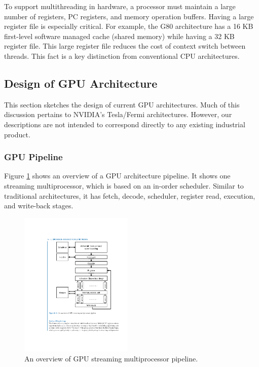 \documentclass[twocolumn]{article}
\begin{document}
To support multithreading in hardware, a processor must maintain a large number of registers, PC registers, and memory operation buffers. Having a large register file is especially critical. For example, the G80 architecture has a 16 KB first-level software managed cache (shared memory) while having a 32 KB register file. This large register file reduces the cost of context switch between threads. This fact is a key distinction from conventional CPU architectures.

\subsection{Design of GPU Architecture}
This section sketches the design of current GPU architectures. Much of this discussion pertains to NVIDIA’s Tesla/Fermi architectures. However, our descriptions are not intended to correspond directly to any existing industrial product.

\subsubsection{GPU Pipeline}
Figure \ref{fig:streaming-processor} shows an overview of a GPU architecture pipeline. It shows one streaming multiprocessor, which is based on an in-order scheduler. Similar to traditional architectures, it has fetch, decode, scheduler, register read, execution, and write-back stages.
\begin{figure}[htb]
        \centering
        \includegraphics[width=0.48\textwidth]{gpu-streaming-pipeline.pdf}
        \caption{An overview of GPU streaming multiprocessor pipeline.}
        \label{fig:streaming-processor}
\end{figure}
\end{document}

